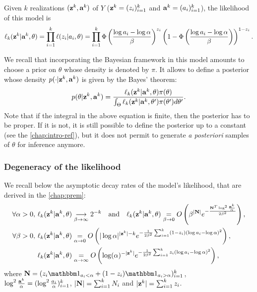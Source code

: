 Given $k$ realizations $(\mathbf{z}^k,\mathbf{a}^k)$ of $Y$ ($\mathbf{z}^k=(z_i)_{i=1}^k$ and $\mathbf{a}^k=(a_i)_{i=1}^k$), the likelihood of this model is
\begin{equation}\label{eq:constr-frag:likelihood}
    \ell_k(\mathbf{z}^k|\mathbf{a}^k,\theta) = \prod_{i=1}^k\ell(z_i|a_i,\theta) = \prod_{i=1}^k\Phi\left(\frac{\log a_i-\log\alpha}{\beta}\right)^{z_i}\left(1-\Phi\left(\frac{\log a_i-\log\alpha}{\beta}\right)\right)^{1-z_i}.
\end{equation}






We recall that incorporating the Bayesian framework in this model amounts to choose a prior on $\theta$ whose density is denoted by $\pi$.
It allows to define a posterior whose density $p(\cdot|\mathbf{z}^k,\mathbf{a}^k)$ is given by the Bayes' theorem:
\begin{equation}\label{eq:constr-frag:posterior}
    p(\theta|\mathbf{z}^k,\mathbf{a}^k) = \frac{\ell_k(\mathbf{z}^k|\mathbf{a}^k,\theta)\pi(\theta)}{\int_{\Theta}\ell_k(\mathbf{z}^k|\mathbf{a}^k,\theta')\pi(\theta')d\theta'}.
\end{equation}
Note that if the integral in the above equation is finite, then the posterior has to be proper. If it is not, it is still possible to define the posterior up to a constant (see the \cref{chap:intro-ref}), but it does not permit to generate \emph{a posteriori} samples of $\theta$ for inference anymore.




\subsubsection{Degeneracy of the likelihood}

We recall below the asymptotic decay rates of the model's likelihood, that are derived in the \cref{chap:prem}:
\begin{align}
    \forall\alpha>0,\, \ell_k(\mathbf{z}^k|\mathbf{a}^k,\theta) &\overset{\ }{\underset{\beta\rightarrow\infty}{\longrightarrow}}2^{-k}\quad\text{and}\quad
        \ell_k(\mathbf{z}^k|\mathbf{a}^k,\theta) \overset{}{\underset{\beta\rightarrow0}{=}}O\left(\beta^{|\mathbf{N}|}e^{-\frac{\mathbf{N}^T\log^2\frac{\mathbf{a}^k}{\alpha}}{2\beta^2}}\right) ,\\
    \forall\beta>0,\, \ell_k(\mathbf{z}^k|\mathbf{a}^k,\theta)  &\overset{}{\underset{\alpha\rightarrow0}{=}}  O\left(|\log\alpha|^{|\mathbf{z}^k|-k} e^{-\frac{1}{2\beta^2}\sum_{i=1}^k (1-z_i)(\log a_i-\log\alpha)^2} \right),\\
    \ell_k(\mathbf{z}^k|\mathbf{a}^k,\theta) &\overset{}{\underset{\alpha\rightarrow\infty}{=}}  O\left(\log(\alpha)^{-|\mathbf{z}^k|} e^{-\frac{1}{2\beta^2}\sum_{i=1}^k z_i(\log a_i-\log\alpha)^2} \right) ,
\end{align}
where $\mbf N=(z_i\indic_{a_i<\alpha}+(1-z_i)\indic_{a_i>\alpha})_{i=1}^k$, $\log^2\frac{\mathbf{a}^k}{\alpha}=(\log^2\frac{a_i}{\alpha})_{i=1}^k$, 
    $|\mathbf{N}|=\sum_{i=1}^kN_i$ and
    $|\mathbf{z}^k|=\sum_{i=1}^kz_i$. %


